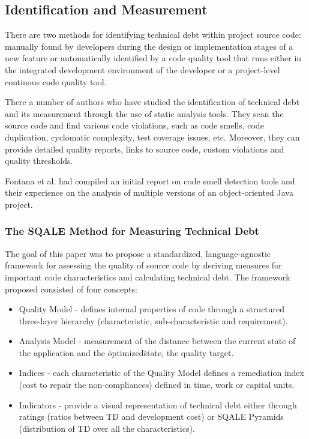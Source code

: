 \documentclass{mprop}
\begin{document}
\subsection{Identification and Measurement}

There are two methods for identifying technical debt within project source code:
manually found by developers during the design or implementation stages of a new
feature or automatically identified by a code quality tool that runs either in
the integrated development environment of the developer or a project-level
continous code quality tool.

There a number of authors who have studied the identification of technical debt
and its measurement through the use of static analysis tools. They scan the
source code and find various code violations, such as code smells, code
duplication, cyclomatic complexity, test coverage issues, etc. Moreover, they
can provide detailed quality reports, links to source code, custom violations
and quality thresholds.

Fontana et al. \cite{Fontana2011} had compiled an initial report on code smell
detection tools and their experience on the analysis of multiple versions of an
object-oriented Java project.


\subsubsection{The SQALE Method for Measuring Technical Debt}
\cite{Letouzey2012} The goal of this paper was to propose a standardized,
language-agnostic framework for assessing the quality of source code by deriving
measures for important code characteristics and calculating technical debt. The
framework proposed consisted of four concepts:
\begin{itemize}
	\item Quality Model - defines internal properties of code through a
	structured three-layer hierarchy (characteristic, sub-characteristic and
	requirement).
	\item Analysis Model - measurement of the distance between the current
	state of the application and the \"optimized\" state, the quality target.
	\item Indices - each characteristic of the Quality Model defines a
	remediation index (cost to repair the non-compliances) defined in time,
	work or capital units.
	\item Indicators - provide a visual representation of technical debt
	either through ratings (ratios between TD and development cost) or SQALE
	Pyramids (distribution of TD over all the characteristics).
\end{itemize}
\end{document}
